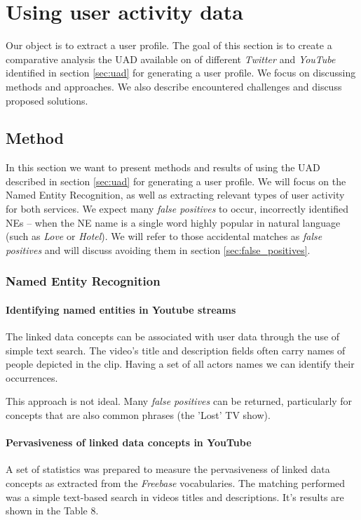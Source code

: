 \section{Using user activity data}
\label{sec:usage_uad}

Our object is to extract a user profile. The goal of this section is to create a comparative analysis the UAD
available on of different \textit{Twitter} and \textit{YouTube} identified in section \ref{sec:uad} for generating
a user profile. We focus on discussing methods and approaches. We also describe encountered challenges and discuss
proposed solutions.

\subsection{Method}
In this section we want to present methods and results of using the UAD described in section \ref{sec:uad} for
generating a user profile. We will focus on the Named Entity Recognition, as well as extracting relevant types
of user activity for both services. We expect many \textit{false positives} to occur, \ie incorrectly identified NEs
-- when the NE name is a single word highly popular in natural language (such as \textit{Love} or \textit{Hotel}).
We will refer to those accidental matches as \textit{false positives} and will discuss avoiding them in section
\ref{sec:false_positives}.

\subsubsection{Named Entity Recognition}
\label{sec:ner}

\paragraph{Identifying named entities in Youtube streams}
The linked data concepts can be associated with user data through the use of
simple text search. The video's title and description fields often carry names
of people depicted in the clip. Having a set of all actors names we can
identify their occurrences.

This approach is not ideal. Many \textit{false positives} can be returned, particularly
for concepts that are also common phrases (\eg the 'Lost' TV show).

\paragraph{Pervasiveness of linked data concepts in YouTube}
A set of statistics was prepared to measure the pervasiveness of linked data
concepts as extracted from the \textit{Freebase} vocabularies. The matching performed
was a simple text-based search in videos titles and descriptions. It's results
are shown in the Table 8.


